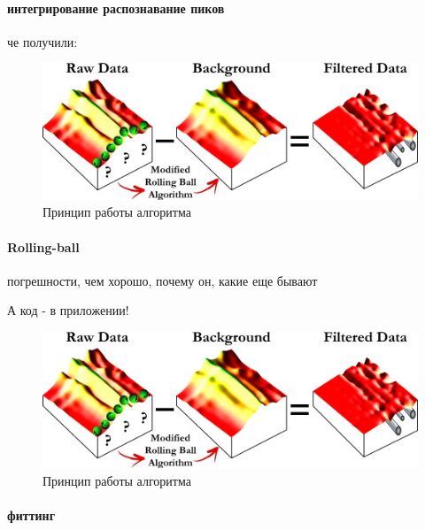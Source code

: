 	\paragraph{интегрирование распознавание пиков}
	че получили:
		\begin{figure}
    \includegraphics[width=\textwidth]{fig/rolling-ball.jpg}
    \caption{Принцип работы алгоритма}
    \label{fig:rolling-ball}
\end{figure}
	
	\paragraph{Rolling-ball}
	погрешности, чем хорошо, почему он, какие еще бывают
	
	А код - в приложении!
	
	\begin{figure}
    \includegraphics[width=\textwidth]{fig/rolling-ball.jpg}
    \caption{Принцип работы алгоритма}
    \label{fig:rolling-ball}
\end{figure}

    \paragraph{фиттинг}

